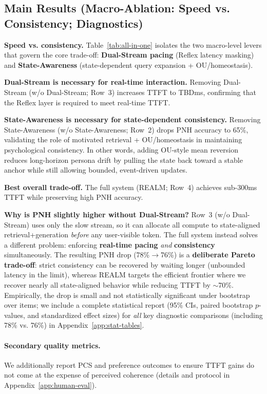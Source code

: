 \documentclass{article}
\begin{document}
\subsection{Main Results (Macro-Ablation: Speed vs. Consistency; Diagnostics)}
\label{sec:main-results}
\textbf{Speed vs. consistency.}
Table~\ref{tab:all-in-one} isolates the two macro-level levers that govern the core trade-off: \textbf{Dual-Stream pacing} (Reflex latency masking) and \textbf{State-Awareness} (state-dependent query expansion + OU/homeostasis).

\textbf{Dual-Stream is necessary for real-time interaction.}
Removing Dual-Stream (w/o Dual-Stream; Row~3) increases TTFT to TBDms, confirming that the Reflex layer is required to meet real-time TTFT.

\textbf{State-Awareness is necessary for state-dependent consistency.}
Removing State-Awareness (w/o State-Awareness; Row~2) drops PNH accuracy to 65\%, validating the role of motivated retrieval + OU/homeostasis in maintaining psychological consistency.
In other words, adding OU-style mean reversion reduces long-horizon persona drift by pulling the state back toward a stable anchor while still allowing bounded, event-driven updates.

\textbf{Best overall trade-off.}
The full system (REALM; Row~4) achieves sub-300ms TTFT while preserving high PNH accuracy.

\textbf{Why is PNH slightly higher without Dual-Stream?}
Row~3 (w/o Dual-Stream) uses only the slow stream, so it can allocate all compute to state-aligned retrieval+generation \emph{before} any user-visible token.
The full system instead solves a different problem: enforcing \textbf{real-time pacing} \emph{and} \textbf{consistency} simultaneously.
The resulting PNH drop (78\%$\to$76\%) is a \textbf{deliberate Pareto trade-off}: strict consistency can be recovered by waiting longer (unbounded latency in the limit), whereas REALM targets the efficient frontier where we recover nearly all state-aligned behavior while reducing TTFT by $\sim$70\%.
Empirically, the drop is small and not statistically significant under bootstrap over items; we include a complete statistical report (95\% CIs, paired bootstrap $p$-values, and standardized effect sizes) for \emph{all} key diagnostic comparisons (including 78\% vs. 76\%) in Appendix~\ref{app:stat-tables}.



\paragraph{Secondary quality metrics.}
We additionally report PCS and preference outcomes to ensure TTFT gains do not come at the expense of perceived coherence (details and protocol in Appendix~\ref{app:human-eval}).
\end{document}
